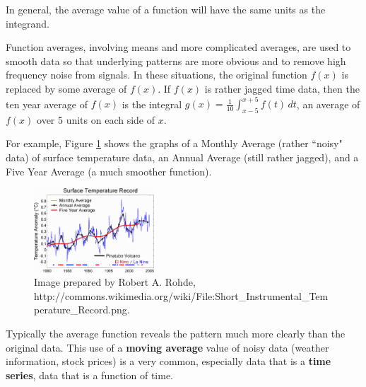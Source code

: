 \begin{note}
In general, the average value of a function will have the same units as the integrand.
\end{note}

Function averages, involving means and more complicated averages, are used to smooth data so that underlying patterns are more obvious and to remove high frequency noise from signals. In these situations, the original function $f(x)$ is replaced by some average of $f(x)$. If $f(x)$ is rather jagged time data, then the ten year average of $f(x)$ is the integral $g(x) = \displaystyle\frac{1}{10}\int_{x-5}^{x+5}f(t)\,dt$, an average of $f(x)$ over 5 units on each side of $x$.

For example, Figure \ref{fig:5-8-temp} shows the graphs of a Monthly Average (rather ``noisy" data) of surface temperature data, an Annual Average (still rather jagged), and a Five Year Average (a much smoother function).

\begin{figure}[!ht]
  \centering
    \includegraphics[width=0.4\textwidth]{img/chap5/image054.png}
    \caption{Image prepared by Robert A. Rohde,\\ http://commons.wikimedia.org/wiki/File:Short\_Instrumental\_Temperature\_Record.png.}
    \label{fig:5-8-temp}
\end{figure}
Typically the average function reveals the pattern much more clearly than the original data. This use of a {\bf moving average} value of noisy data (weather information, stock prices) is a very common, especially data that is a {\bf time series}, data that is a function of time.

